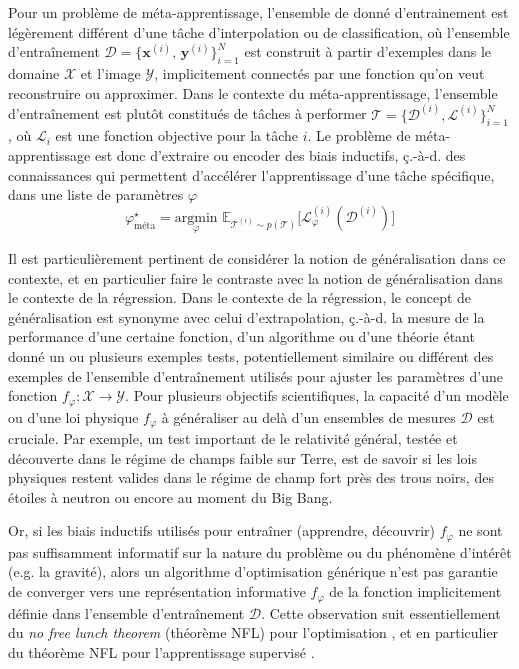 Pour un problème de méta-apprentissage, l'ensemble de donné d'entrainement est légèrement différent d'une tâche d'interpolation ou de classification, 
où l'ensemble d'entraînement $\mathcal{D} = \{\mathbf{x}^{(i)},\,\mathbf{y}^{(i)}\}_{i=1}^{N}$ 
est construit à partir d'exemples dans le domaine $\mathcal{X}$ et l'image $\mathcal{Y}$, implicitement connectés par une fonction qu'on veut reconstruire ou 
approximer. Dans le contexte du méta-apprentissage, l'ensemble d'entraînement est plutôt constitués de tâches à performer $\mathcal{T} = \{\mathcal{D}^{(i)}, \mathcal{L}^{(i)}\}_{i=1}^{N}$, où 
$\mathcal{L}_i$ est une fonction objective pour la tâche $i$. 
Le problème de méta-apprentissage est donc d'extraire ou encoder des biais inductifs, ç.-à-d. des connaissances qui permettent d'accélérer 
l'apprentissage d'une tâche spécifique, dans une liste de paramètres $\varphi$
\begin{equation}\label{eq:meta-learning}
        \varphi^{\star}_{\text{méta}} = \underset{\varphi}{\mathrm{argmin}}\,\, \mathbb{E}_{\mathcal{T}^{(i)} \sim p(\mathcal{T})} \bigg[ \mathcal{L}^{(i)}_\varphi(\mathcal{D}^{(i)}) \bigg]
\end{equation} 

Il est particulièrement pertinent de considérer la notion de généralisation dans ce contexte, et en particulier faire le contraste avec 
la notion de généralisation dans le contexte de la régression. Dans le contexte de la régression, le concept de généralisation est synonyme 
avec celui d'extrapolation, ç.-à-d. la mesure de la performance d'une certaine fonction, d'un algorithme ou d'une théorie étant donné un ou plusieurs exemples tests, 
potentiellement similaire ou différent des exemples de l'ensemble d'entraînement utilisés pour ajuster les paramètres d'une fonction 
$f_\varphi: \mathcal{X} \rightarrow \mathcal{Y}$. Pour plusieurs objectifs scientifiques, la capacité d'un modèle ou d'une loi physique $f_\varphi$ 
à généraliser au delà d'un ensembles de mesures $\mathcal{D}$ est cruciale. 
Par exemple, un test important de le relativité général, testée et découverte dans le régime de champs faible sur Terre, est 
de savoir si les lois physiques restent valides dans le régime de champ fort près des trous noirs, des étoiles à neutron ou encore 
au moment du Big Bang. 

Or, si les biais inductifs utilisés pour entraîner (apprendre, découvrir) $f_\varphi$ ne sont pas suffisamment 
informatif sur la nature du problème ou du phénomène d'intérêt (e.g. la gravité), 
alors un algorithme d'optimisation générique n'est pas garantie de converger 
vers une représentation informative $f_\varphi$ de la fonction implicitement 
définie dans l'ensemble d'entraînement $\mathcal{D}$. Cette observation suit essentiellement du \textit{no free lunch theorem} (théorème NFL) pour 
l'optimisation \citep{Wolpert1997}, et en particulier 
du théorème NFL pour l'apprentissage supervisé \citep{Wolpert1992,Wolpert1996}.


